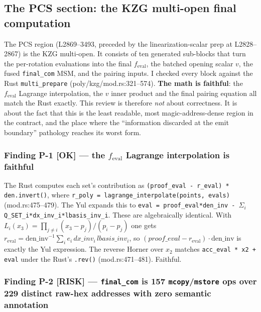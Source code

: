 \subsection{The PCS section: the KZG multi-open final computation}
\label{sec:pr-pcs}

The PCS region (L2869--3493, preceded by the linearization-scalar
prep at L2828--2867) is the KZG multi-open. It consists of ten
generated sub-blocks that turn the per-rotation evaluations into the
final $f_{\text{eval}}$, the batched opening scalar $v$, the fused
\texttt{final\_com} MSM, and the pairing inputs. I checked every
block against the Rust \texttt{multi\_prepare}
(poly/kzg/mod.rs:321--574). \textbf{The math is faithful}: the
$f_{\text{eval}}$ Lagrange interpolation, the $v$ inner product and
the final pairing equation all match the Rust exactly. This review
is therefore \emph{not} about correctness. It is about the fact that
this is the least readable, most magic-address-dense region in the
contract, and the place where the ``information discarded at the
emit boundary'' pathology reaches its worst form.

\subsubsection*{Finding P-1 \textcolor{tracegreen}{[OK]} --- the $f_{\text{eval}}$ Lagrange interpolation is faithful}

The Rust computes each set's contribution as
\texttt{(proof\_\allowbreak{}eval - r\_\allowbreak{}eval) * den.invert()}, where
\texttt{r\_\allowbreak{}poly = lagrange\_\allowbreak{}interpolate(points, evals)}
(mod.rs:475--479). The Yul expands this to
\texttt{eval = proof\_\allowbreak{}eval*den\_\allowbreak{}inv - $\Sigma_i$ Q\_\allowbreak{}SET\_\allowbreak{}i*dx\_\allowbreak{}inv\_\allowbreak{}i*lbasis\_\allowbreak{}inv\_\allowbreak{}i}.
These are algebraically identical. With
$L_i(x_3)=\prod_{j\ne i}(x_3-p_j)/(p_i-p_j)$ one gets
$r_{\text{eval}} = \text{den\_inv}^{-1}\sum_i e_i\,dx\_inv_i\,lbasis\_inv_i$,
so $(proof\_eval-r_{\text{eval}})\cdot\text{den\_inv}$ is exactly the
Yul expression. The reverse Horner over $x_2$ matches
\texttt{acc\_\allowbreak{}eval * x2 + eval} under the Rust's \texttt{.rev()}
(mod.rs:471--481). Faithful.

\subsubsection*{Finding P-2 \textcolor{rustorange}{[RISK]} --- \texttt{final\_com} is 157 \texttt{mcopy}/\texttt{mstore} ops over 229 distinct raw-hex addresses with zero semantic annotation}

